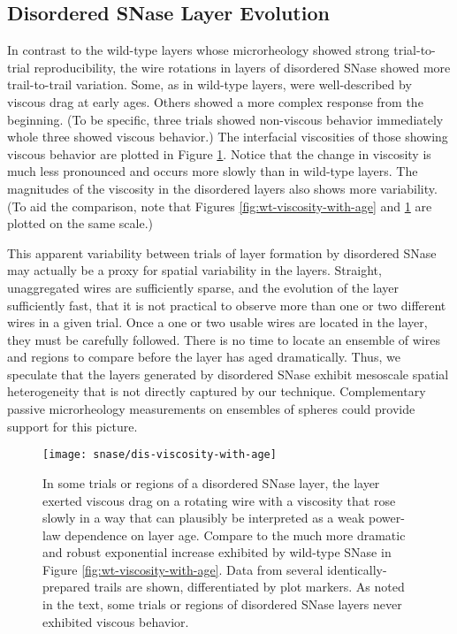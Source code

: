\subsection{Disordered SNase Layer Evolution}

In contrast to the wild-type layers whose microrheology showed strong trial-to-trial reproducibility, the wire rotations in layers of disordered SNase showed more trail-to-trail variation. Some, as in wild-type layers, were well-described by viscous drag at early ages. Others showed a more complex response from the beginning. (To be specific, three trials showed non-viscous behavior immediately whole three showed viscous behavior.) The interfacial viscosities of those showing viscous behavior are plotted in Figure \ref{fig:dis-viscosity-with-age}. Notice that the change in viscosity is much less pronounced and occurs more slowly than in wild-type layers. The magnitudes of the viscosity in the disordered layers also shows more variability. (To aid the comparison, note that Figures \ref{fig:wt-viscosity-with-age} and \ref{fig:dis-viscosity-with-age} are plotted on the same scale.)

This apparent variability between trials of layer formation by disordered SNase may actually be a proxy for spatial variability in the layers. Straight, unaggregated wires are sufficiently sparse, and the evolution of the layer sufficiently fast, that it is not practical to observe more than one or two different wires in a given trial. Once a one or two usable wires are located in the layer, they must be carefully followed. There is no time to locate an ensemble of wires and regions to compare before the layer has aged dramatically. Thus, we speculate that the layers generated by disordered SNase exhibit mesoscale spatial heterogeneity that is not directly captured by our technique. Complementary passive microrheology measurements on ensembles of spheres could provide support for this picture.

   \begin{figure}
    \centering
    \texttt{[image: snase/dis-viscosity-with-age]}
    \caption{\label{fig:dis-viscosity-with-age}In some trials or regions of a disordered SNase layer, the layer exerted viscous drag on a rotating wire with a viscosity that rose slowly in a way that can plausibly be interpreted as a weak power-law dependence on layer age. Compare to the much more dramatic and robust exponential increase exhibited by wild-type SNase in Figure \ref{fig:wt-viscosity-with-age}. Data from several identically-prepared trails are shown, differentiated by plot markers. As noted in the text, some trials or regions of disordered SNase layers never exhibited viscous behavior.}
    \end{figure}


